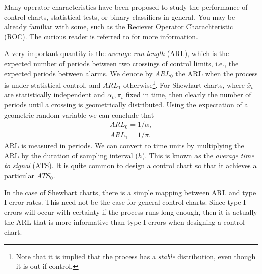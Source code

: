 \begin{extra}
Many operator characteristics have been proposed to study the performance of control charts, statistical tests, or binary classifiers in general.
You may be already familiar with some, such as the Reciever Operator Charachteristic (ROC). 
The curious reader is referred to \cite{wikipedia_receiver_2015} for more information.
\end{extra}


A very important quantity is the \emph{average run length} (ARL), which is the expected number of periods between two crossings of control limits, i.e., the expected periods between alarms. 
We denote by $ARL_0$ the ARL when the process is under statistical control, and $ARL_1$ otherwise\footnote{Note that it is implied that the process has a \emph{stable} distribution, even though it is out if control.}. 
For Shewhart charts, where $\bar{x}_t$ are statistically independent and $\alpha_t,\pi_t$ fixed in time, then clearly the number of periods until a crossing is geometrically distributed. Using the expectation of a geometric random variable we can conclude that 
\begin{align}
	ARL_0=1/\alpha \label{eq:arl_0}, \\
	ARL_1=1/\pi \label{eq:arl_1}.
\end{align}
ARL is measured in periods. 
We can convert to time units by multiplying the ARL by the duration of sampling interval ($h$).
This is known as the \emph{average time to signal} (ATS).
It is quite common to design a control chart so that it achieves a particular $ATS_0$.

\begin{remark}
In the case of Shewhart charts, there is a simple mapping between ARL and type I error rates.
This need not be the case for general control charts. 
Since type I errors will occur with certainty if the process runs long enough, then it is actually the ARL that is more informative than type-I errors when designing a control chart.
\end{remark}


